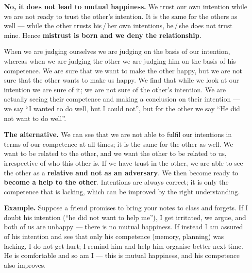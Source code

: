 
\ans \textbf{No, it does not lead to mutual happiness.} We trust our own
intention while we are not ready to trust the other's intention. It is the
same for the others as well --- while the other trusts his\,/\,her own
intentions, he\,/\,she does not trust mine. Hence \textbf{mistrust is born and
we deny the relationship}.

When we are judging ourselves we are judging on the basis of our intention,
whereas when we are judging the other we are judging him on the basis of his
competence. We are sure that we want to make the other happy, but we are not
sure that the other wants to make us happy. We find that while we look at our
intention we are sure of it; we are not sure of the other's intention. We are
actually seeing their competence and making a conclusion on their intention
--- we say ``I wanted to do well, but I could not'', but for the other we say
``He did not want to do well''.

\textbf{The alternative.} We can see that we are not able to fulfil our
intentions in terms of our competence at all times; it is the same for the
other as well. We want to be related to the other, and we want the other to be
related to us, irrespective of who this other is. If we have trust in the
other, we are able to see the other as a \textbf{relative and not as an
adversary}. We then become ready to \textbf{become a help to the other}.
Intentions are always correct; it is only the competence that is lacking,
which can be improved by the right understanding.

\textbf{Example.} Suppose a friend promises to bring your notes to class and
forgets. If I doubt his intention (``he did not want to help me''), I get
irritated, we argue, and both of us are unhappy --- there is no mutual
happiness. If instead I am assured of his intention and see that only his
competence (memory, planning) was lacking, I do not get hurt; I remind him and
help him organise better next time. He is comfortable and so am I --- this is
mutual happiness, and his competence also improves.

%
  {}

